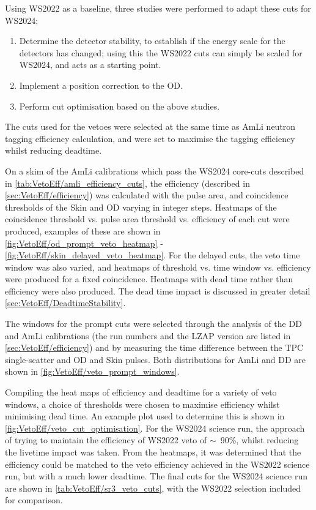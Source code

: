 Using WS2022 as a baseline, three studies were performed to adapt these cuts for WS2024;
\begin{enumerate}
	\item Determine the detector stability, to establish if the energy scale for the detectors has changed; using this the WS2022 cuts can simply be scaled for WS2024, and acts as a starting point.
	\item Implement a position correction to the OD.
	\item Perform cut optimisation based on the above studies.
\end{enumerate}
The cuts used for the vetoes were selected at the same time as AmLi neutron tagging efficiency calculation, and were set to maximise the tagging efficiency whilst reducing deadtime.

On a skim of the AmLi calibrations which pass the WS2024 core-cuts described in \autoref{tab:VetoEff/amli_efficiency_cuts}, the efficiency (described in \autoref{sec:VetoEff/efficiency}) was calculated with the pulse area, and coincidence thresholds of the Skin and OD varying in integer steps.
Heatmaps of the coincidence threshold vs. pulse area threshold vs. efficiency of each cut were produced, examples of these are shown in \autoref{fig:VetoEff/od_prompt_veto_heatmap} - \ref{fig:VetoEff/skin_delayed_veto_heatmap}.
For the delayed cuts, the veto time window was also varied, and heatmaps of threshold vs. time window vs. efficiency were produced for a fixed coincidence. Heatmaps with dead time rather than efficiency were also produced. The dead time impact is discussed in greater detail \autoref{sec:VetoEff/DeadtimeStability}.

The windows for the prompt cuts were selected through the analysis of the DD and AmLi calibrations (the run numbers and the LZAP version are listed in \autoref{sec:VetoEff/efficiency}) and by measuring the time difference between the TPC single-scatter and OD and Skin pulses.
Both distributions for AmLi and DD are shown in \autoref{fig:VetoEff/veto_prompt_windows}.

Compiling the heat maps of efficiency and deadtime for a variety of veto windows, a choice of thresholds were chosen to maximise efficiency whilst minimising dead time. An example plot used to determine this is shown in \autoref{fig:VetoEff/veto_cut_optimisation}.
For the WS2024 science run, the approach of trying to maintain the efficiency of WS2022 veto of $\sim$~90\%, whilst reducing the livetime impact was taken.
From the heatmaps, it was determined that the efficiency could be matched to the veto efficiency achieved in the WS2022 science run, but with a much lower deadtime.
The final cuts for the WS2024 science run are shown in \autoref{tab:VetoEff/sr3_veto_cuts}, with the WS2022 selection included for comparison.

